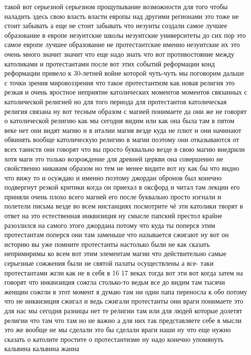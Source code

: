 такой вот серьезной серьезном прощупывание возможности для того чтобы наладить
здесь свою власть власти европы над другими регионами это тоже не стоит забывать
а еще не стоит забывать что иезуиты создали самое лучшее образование в европе
иезуитские школы иезуитские университеты до сих пор это самое европе лучшее
образование не протестантские именно иезуитские их это очень много значит значит
что еще надо знать что вот противостояние между католиками и протестантами после
вот этих событий реформации конд реформации привело к 30-летней войне которой
чуть-чуть мы поговорим дальше с точки зрения мировоззрения что такое
протестантизм как новая религия это резкая и очень яростное неприятие
католических моментов моментов связанных с католической религией но для того
периода для протестантов католическая религия связана ну вот тесным образом с
магией понимаете да они же не говорят о католической религию как мы сегодня
видим или как она была там в пятом веке нет они видят магию и в италии магия
везде куда не плют и они начинают обвинять вообще католическую религию в магии
поэтому они отказываются от всех таинств они говорят что вы просто буквально
везде в свою магию внедрили хотя маги это только возрождение для древней церкви
она совершенно не свойственно никаким образом но тем не менее видите вот ну как
бы что видно что вижу то и осуждаю и именно поэтому джордан обронов был конечно
подвергнут резкой критики когда он приехал в оксфорд и читал там лекции его
приняли очень плохо всего магией его после буквально просто изгнали и полетели
письма везде во всем инстанциях посмотрите чё эти католики творят в ответ на это
естественная инквизиция ну смысле папский престол крайне разозлился на самого
этого джордана потому что куда ты поперся этим протестантам поперся они там
заменьше что называется сжигают ну вот он историю вы уже помните протестанты
настолько были не как сказать непримиримы ко всем вот этим элементам магии что
действительно самые серьезные сожжения были не святой палаты осуществлены а все-
таки протестантами жгли как не в себя в 16 17 веках тогда вот эти вот когда
затем на говорят что инквизиция сожгла столько-то ведьм все до видим там тысячи
женщин сожгли в этот момент я думаю там ни один папа переносла к обо потому что
не инквизиция сжигал и ведь сжигали протестанты они враги понимаете это для нас
мы сегодня разницы нет те религии там или для людей которые долетят религии что
там что там но не важно а для них так представляете себе в мысли это же вообще
не мы сделали это бы сделали враги наши ну что еще нужно сказать о католите
простите о протестантизме ну надо конечно упомянуть кальвина кальвина жанна
